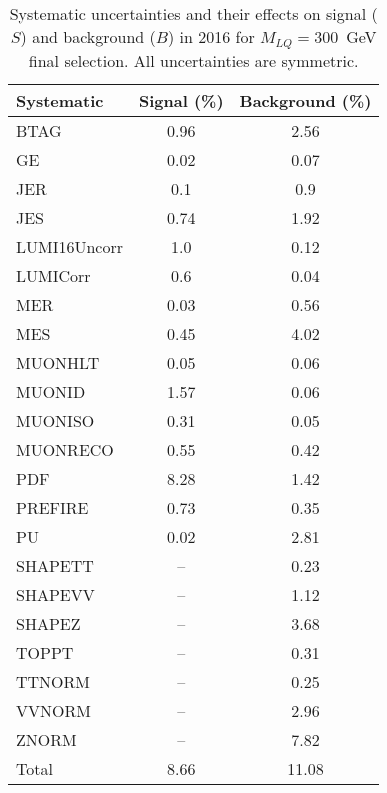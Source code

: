 \begin{table}[htbp]
\begin{center}
\caption{Systematic uncertainties and their effects on signal ($S$) and background ($B$) in 2016 for $M_{LQ}=300$~GeV final selection. All uncertainties are symmetric.}
\begin{tabular}{lcc}
\hline\hline
Systematic & Signal (\%) & Background (\%) \\ \hline 
BTAG & 0.96 & 2.56\\ 
GE & 0.02 & 0.07\\ 
JER & 0.1 & 0.9\\ 
JES & 0.74 & 1.92\\ 
LUMI16Uncorr & 1.0 & 0.12\\ 
LUMICorr & 0.6 & 0.04\\ 
MER & 0.03 & 0.56\\ 
MES & 0.45 & 4.02\\ 
MUONHLT & 0.05 & 0.06\\ 
MUONID & 1.57 & 0.06\\ 
MUONISO & 0.31 & 0.05\\ 
MUONRECO & 0.55 & 0.42\\ 
PDF & 8.28 & 1.42\\ 
PREFIRE & 0.73 & 0.35\\ 
PU & 0.02 & 2.81\\ 
SHAPETT & -- & 0.23\\ 
SHAPEVV & -- & 1.12\\ 
SHAPEZ & -- & 3.68\\ 
TOPPT & -- & 0.31\\ 
TTNORM & -- & 0.25\\ 
VVNORM & -- & 2.96\\ 
ZNORM & -- & 7.82\\ 
Total & 8.66 & 11.08\\ \hline \hline
\end{tabular}
\label{tab:SysUncertainties_uujj_300}
\end{center}
\end{table}

